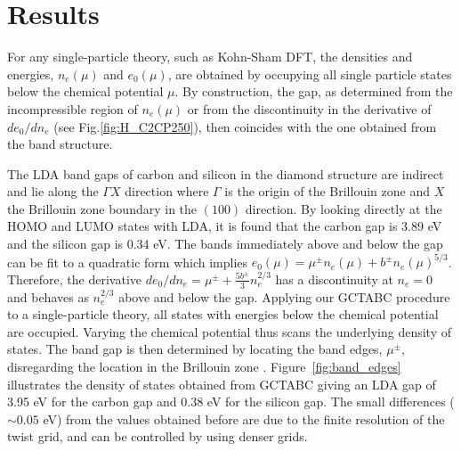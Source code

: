 \section{Results\label{sec:bg-results}}

For any single-particle theory, such as Kohn-Sham DFT,
the densities and energies, $n_e(\mu)$ and $e_0(\mu)$,
are obtained by occupying all single particle states below the chemical potential $\mu$.
By construction, the gap, as determined from the incompressible region of $n_e(\mu)$ or from the discontinuity in the derivative of $de_0/dn_e$ (see Fig.\ref{fig:H_C2CP250}), then coincides with the one obtained from the band structure.

The LDA band gaps of carbon and silicon in the diamond structure are indirect and lie along the $\Gamma X$ direction where $\Gamma$ is the origin of the Brillouin zone and
$X$ the Brillouin zone boundary in the $(100)$ direction. By looking directly at the HOMO and LUMO states with LDA, it is found that
the carbon gap is 3.89 eV %
and the silicon gap is  0.34 eV.
The bands immediately above and below the gap can be fit
to a quadratic form which implies $e_0(\mu) = \mu^{\pm} n_e(\mu) + b^\pm n_e(\mu)^{5/3}$. Therefore, the derivative $de_0/dn_e = \mu^{\pm} + \frac{5b^{\pm}}{3} n_e^{2/3}$ has a discontinuity at $n_e=0$ and behaves as $ n_e^{2/3}$ above and below the gap. 
Applying our GCTABC procedure to a single-particle theory,
all states with energies below the chemical potential are occupied. Varying the chemical potential
thus scans the underlying density of states. The band gap is then determined by locating the band
edges, $\mu^\pm$, disregarding the location in the Brillouin zone \cite{BrillouinFootnote}.
Figure~\ref{fig:band_edges} illustrates the density of states
obtained from GCTABC giving an LDA gap of 3.95 eV for the carbon gap
and 0.38 eV for the silicon gap. %
The small differences ($\sim 0.05$ eV) from the values obtained before are due to the finite
resolution of the twist grid, and can be controlled by using denser grids.

